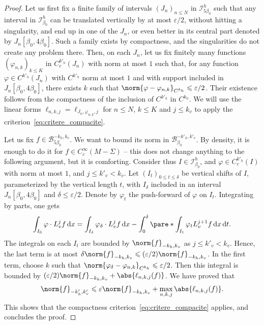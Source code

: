 \documentclass[11pt, a4paper, oneside, final, pagebackref]{amsart}
\newcommand{\boI}{\mathcal{I}}
\newcommand{\boB}{\mathcal{B}}
\newcommand{\dd}{\mathop{}\!\mathrm{d}}
\renewcommand{\epsilon}{\varepsilon}
\renewcommand{\phi}{\varphi}
\renewcommand{\leq}{\leqslant}
\theoremstyle{definition}
\numberwithin{equation}{section}
\begin{document}
\begin{proof}
Let us first fix a finite family of intervals $(J_n)_{n\leq N}$ in
$\boI^h_{5\beta_0}$ such that any interval in $\boI^h_{\beta_0}$ can be
translated vertically by at most $\epsilon/2$, without hitting a singularity,
and end up in one of the $J_n$, or even better in its central part denoted by
$J_n[\beta_0,4\beta_0]$. Such a family exists by compactness, and the
singularities do not create any problem there. Then, on each $J_n$, let us
fix finitely many functions $(\phi_{n,k})_{k\leq K}$ in $C^{k'_h}_c(J_n)$
with norm at most $1$ such that, for any function $\phi \in C^{k'_h}(J_n)$
with $C^{k'_h}$ norm at most $1$ and with support included in $J_n[\beta_0,
4\beta_0]$, there exists $k$ such that $\norm{\phi - \phi_{n,k}}_{C^{k_h}}
\leq \epsilon/2$. Their existence follows from the compactness of the
inclusion of $C^{k'_h}$ in $C^{k_h}$. We will use the linear forms
$\ell_{n,k,j} = \ell_{J_n, \phi_{n,k}, j}$ for $n \leq N$, $k \leq K$ and $j
\leq k_v$ to apply the criterion~\eqref{eq:critere_compacite}.

Let us fix $f \in \boB^{-k_h, k_v}_{5\beta_0}$. We want to bound its norm in
$\boB^{-k'_h, k'_v}_{\beta_0}$. By density, it is enough to do it for $f \in
C^\infty_c(M-\Sigma)$ -- this does not change anything to the following
argument, but it is comforting. Consider thus $I \in \boI^h_{\beta_0}$, and
$\phi \in C_c^{k'_h}(I)$ with norm at most $1$, and $j \leq k'_v < k_v$. Let
$(I_t)_{0 \leq t \leq \delta}$ be vertical shifts of $I$, parameterized by
the vertical length $t$, with $I_\delta$ included in an interval
$J_n[\beta_0,4\beta_0]$ and $\delta \leq \epsilon/2$. Denote by $\phi_t$ the
push-forward of $\phi$ on $I_t$. Integrating by parts, one gets
\begin{equation*}
  \int_{I_0} \phi\cdot L_v^j f \dd x = \int_{I_\delta} \phi_\delta \cdot L_v^j f \dd x
  -\int_0^\delta \pare*{\int_{I_t} \phi_t L_v^{j+1}f \dd x} \dd t.
\end{equation*}
The integrals on each $I_t$ are bounded by $\norm{f}_{-k_h, k_v}$ as $j\leq
k'_v < k_v$. Hence, the last term is at most $\delta \norm{f}_{-k_h, k_v}
\leq (\epsilon/2) \norm{f}_{-k_h, k_v}$. In the first term, choose $k$ such
that $\norm{\phi_\delta - \phi_{n, k}}_{C^{k_h}} \leq \epsilon/2$. Then this
integral is bounded by $(\epsilon/2)\norm{f}_{-k_h, k_v} +
\abs{\ell_{n,k,j}(f)}$. We have proved that
\begin{equation*}
  \norm{f}_{-k'_h, k'_v} \leq \epsilon \norm{f}_{-k_h, k_v} + \max_{n,k,j} \abs{\ell_{n,k,j}(f)}.
\end{equation*}
This shows that the compactness criterion~\eqref{eq:critere_compacite}
applies, and concludes the proof.
\end{proof}
\end{document}
